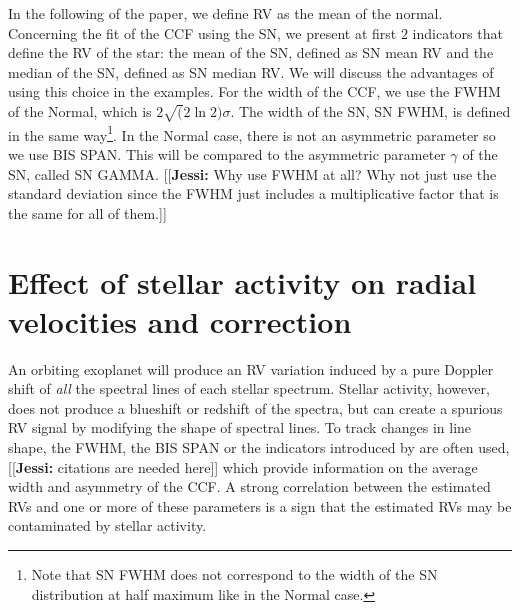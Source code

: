 \documentclass[11pt, oneside]{article}
\newcommand{\jessi}[1]{{\color{Purple}[[\textbf{Jessi: }#1]]}}
\begin{document}
\fi

In the following of the paper, we define RV as the mean of the normal. Concerning the fit of the CCF using the SN, we present at first $2$ indicators that define the RV of the star: the mean of the SN, defined as SN mean RV and the median of the SN, defined as SN median RV. We will discuss the advantages of using this choice in the examples. For the width of the CCF, we use the FWHM of the Normal, which is $2\sqrt(2\ln2)\sigma$. The width of the SN, SN FWHM, is defined in the same way\footnote{Note that SN FWHM does not correspond to the width of the SN distribution at half maximum like in the Normal case.}. In the Normal case, there is not an asymmetric parameter so we use BIS SPAN. This will be compared to the asymmetric parameter $\gamma$ of the SN, called SN GAMMA. \jessi{Why use FWHM at all?  Why not just use the standard deviation since the FWHM just includes a multiplicative factor that is the same for all of them.}







\section{Effect of stellar activity on radial velocities and correction} \label{sec:31}

An orbiting exoplanet will produce an RV variation induced by a pure Doppler shift of \emph{all} the spectral lines of each stellar spectrum. 
Stellar activity, however, does not produce a blueshift or redshift of the spectra, but can create a spurious RV signal by modifying the shape of spectral lines. To track changes in line shape, the FWHM, the BIS SPAN or the indicators introduced by \citet{Figueira-2013} are often used, \jessi{citations are needed here} which provide information on the average width and asymmetry of the CCF. A strong correlation between the estimated RVs and one or more of these parameters is a sign that the estimated RVs may be contaminated by stellar activity.
\end{document}
